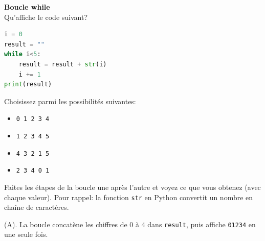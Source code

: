    
    \begin{Exercice}[5 minutes] [Python] \textbf{Boucle while}\\
      	Qu'affiche le code suivant?
      	
      	\begin{lstlisting}[language=Python]
i = 0
result = ""
while i<5:
    result = result + str(i)
    i += 1
print(result)
        		 \end{lstlisting}
             	
        Choisissez parmi les possibilités suivantes:
        
        \begin{itemize}
            \item[(A)] \texttt{0 1 2 3 4}
            \item[(B)] \texttt{1 2 3 4 5}
            \item[(C)] \texttt{4 3 2 1 5}
            \item[(D)] \texttt{2 3 4 0 1}
        \end{itemize}
    
        \begin{conseil}
		   Faites les étapes de la boucle une après l'autre et voyez ce que vous obtenez (avec chaque valeur).  Pour rappel: la fonction \texttt{str} en Python convertit un nombre en chaîne de caractères.
        \end{conseil}
        
        \begin{solution}
            (A). La boucle concatène les chiffres de 0 à 4 dans \texttt{result}, puis affiche \texttt{01234} en une seule fois.
        \end{solution}
    \end{Exercice}
    
